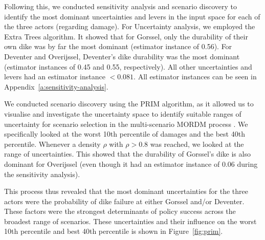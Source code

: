 Following this, we conducted sensitivity analysis and scenario discovery to identify the most dominant uncertainties and levers in the input space for each of the three actors (regarding damage). For Uncertainty analysis, we employed the Extra Trees algorithm. It showed that for Gorssel, only the durability of their own dike was by far the most dominant (estimator instance of 0.56). For Deventer and Overijssel, Deventer's dike durability was the most dominant (estimator instances of 0.45 and 0.55, respectively). All other uncertainties and levers had an estimator instance $<0.081$. All estimator instances can be seen in Appendix~\ref{a:sensitivity-analysis}.

We conducted scenario discovery using the PRIM algorithm, as it allowed us to visualise and investigate the uncertainty space to identify suitable ranges of uncertainty for scenario selection in the multi-scenario MORDM process \parencite{bryant_thinking_2010}. We specifically looked at the worst 10th percentile of damages and the best 40th percentile. Whenever a density $\rho$ with $\rho>0.8$ was reached, we looked at the range of uncertainties. This showed that the durability of Gorssel's dike is also dominant for Overijssel (even though it had an estimator instance of 0.06 during the sensitivity analysis).

This process thus revealed that the most dominant uncertainties for the three actors were the probability of dike failure at either Gorssel and/or Deventer. These factors were the strongest determinants of policy success across the broadest range of scenarios. These uncertainties and their influence on the worst 10th percentile and best 40th percentile is shown in Figure~\ref{fig:prim}.

